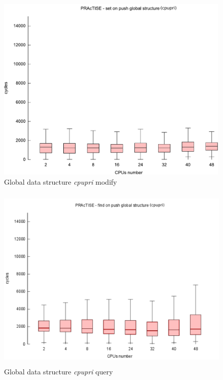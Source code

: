 \begin{figure}[htbp]
	\centering
	\includegraphics[height=3.5in, keepaspectratio]{images/PRACTISE_set_cpupri.pdf}
	\caption{Global data structure \emph{cpupri} modify}
	\label{fig:practise-set-rm}
\end{figure}

\begin{figure}[htbp]
	\centering
	\includegraphics[height=3.5in, keepaspectratio]{images/PRACTISE_find_cpupri.pdf}
	\caption{Global data structure \emph{cpupri} query}
	\label{fig:practise-find-rm}
\end{figure}

